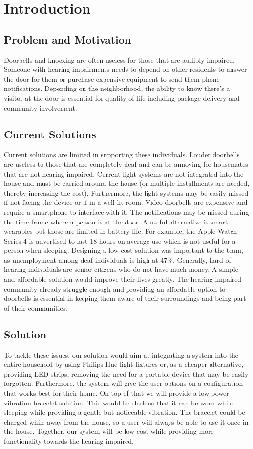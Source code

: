\chapter{Introduction}

\section{Problem and Motivation}

Doorbells and knocking are often useless for those that are audibly impaired. Someone with hearing impairments needs to depend on other residents to answer the door for them or purchase expensive equipment to send them phone notifications. Depending on the neighborhood, the ability to know there’s a visitor at the door is essential for quality of life including package delivery and community involvement.

\section{Current Solutions}
Current solutions are limited in supporting these individuals. Louder doorbells are useless to those that are completely deaf and can be annoying for housemates that are not hearing impaired. Current light systems are not integrated into the house and must be carried around the house (or multiple installments are needed, thereby increasing the cost). Furthermore, the light systems may be easily missed if not facing the device or if in a well-lit room. Video doorbells are expensive and require a smartphone to interface with it. The notifications may be missed during the time frame where a person is at the door. A useful alternative is smart wearables but those are limited in battery life. For example, the Apple Watch Series 4 is advertised to last 18 hours on average use which is not useful for a person when sleeping. Designing a low-cost solution was important to the team, as unemployment among deaf individuals is high at 47\%. Generally, hard of hearing individuals are senior citizens who do not have much money. A simple and affordable solution would improve their lives greatly. The hearing impaired community already struggle enough and providing an affordable option to doorbells is essential in keeping them aware of their surroundings and being part of their communities.

\section{Solution}
To tackle these issues, our solution would aim at integrating a system into the entire household by using Philips Hue light fixtures or, as a cheaper alternative, providing LED strips, removing the need for a portable device that may be easily forgotten. Furthermore, the system will give the user options on a configuration that works best for their home. On top of that we will provide a low power vibration bracelet solution. This would be sleek so that it can be worn while sleeping while providing a gentle but noticeable vibration. The bracelet could be charged while away from the house, so a user will always be able to use it once in the house. Together, our system will be low cost while providing more functionality towards the hearing impaired.
